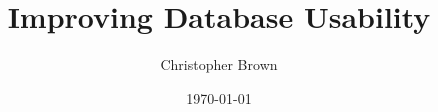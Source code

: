 \documentclass[twoside,abbrevs,bsc,logo,notimes]{styles/infthesis}
\title{Improving Database Usability}
\author{Christopher Brown}
\date{\today}
\begin{document}
  \begin{preliminary}
    \maketitle

    
    \standarddeclaration
    
    \tableofcontents
	\listoffigures
  \end{preliminary}

  
  
  
  
  
  

  \appendix


  
  
\end{document}
